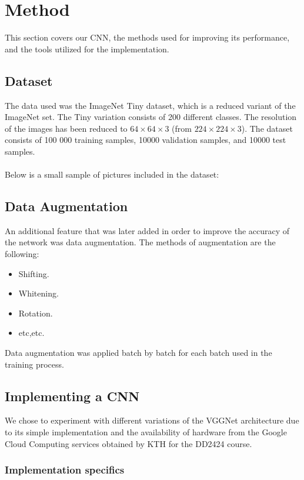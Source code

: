 \documentclass{kthreport}
\begin{document}
\section{Method}
This section covers our CNN, the methods used for improving its performance, and the tools utilized for the implementation. 

\subsection{Dataset}
The data used was the ImageNet Tiny dataset, which is a reduced variant of the ImageNet set. The Tiny variation consists of 200 different classes. The resolution of the images has been reduced to $64\times64\times3$ (from  $224\times224\times3$). The dataset consists of 100 000 training samples, 10000 validation samples, and 10000 test samples.
\\\\
Below is a small sample of pictures included in the dataset:

\FloatBarrier


\subsection{Data Augmentation}
An additional feature that was later added in order to improve the accuracy of the network was data augmentation. The methods of augmentation are the following:\\
\begin{itemize}
\item Shifting.
\item Whitening.
\item Rotation.
\item etc,etc.
\end{itemize}
Data augmentation was applied batch by batch for each batch used in the training process.

\subsection{Implementing a CNN}

We chose to experiment with different variations of the VGGNet architecture due to its simple implementation and the availability of hardware from the Google Cloud Computing services obtained by KTH for the DD2424 course.

\subsubsection{Implementation specifics}
\end{document}
